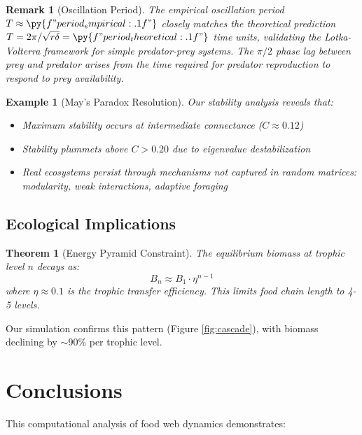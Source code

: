 \documentclass[a4paper, 11pt]{article}
\newtheorem{theorem}{Theorem}[section]
\newtheorem{example}{Example}[section]
\newtheorem{remark}{Remark}[section]
\begin{document}
\begin{remark}[Oscillation Period]
The empirical oscillation period $T \approx \py{f"{period_empirical:.1f}"}$ closely matches the theoretical prediction $T = 2\pi/\sqrt{r\delta} = \py{f"{period_theoretical:.1f}"}$ time units, validating the Lotka-Volterra framework for simple predator-prey systems. The $\pi/2$ phase lag between prey and predator arises from the time required for predator reproduction to respond to prey availability.
\end{remark}

\begin{example}[May's Paradox Resolution]
Our stability analysis reveals that:
\begin{itemize}
\item Maximum stability occurs at intermediate connectance ($C \approx 0.12$)
\item Stability plummets above $C > 0.20$ due to eigenvalue destabilization
\item Real ecosystems persist through mechanisms not captured in random matrices: modularity, weak interactions, adaptive foraging
\end{itemize}
\end{example}

\subsection{Ecological Implications}

\begin{theorem}[Energy Pyramid Constraint]
The equilibrium biomass at trophic level $n$ decays as:
\begin{equation}
B_n \approx B_1 \cdot \eta^{n-1}
\end{equation}
where $\eta \approx 0.1$ is the trophic transfer efficiency. This limits food chain length to 4-5 levels.
\end{theorem}

Our simulation confirms this pattern (Figure \ref{fig:cascade}), with biomass declining by $\sim$90\% per trophic level.

\section{Conclusions}

This computational analysis of food web dynamics demonstrates:
\end{document}
